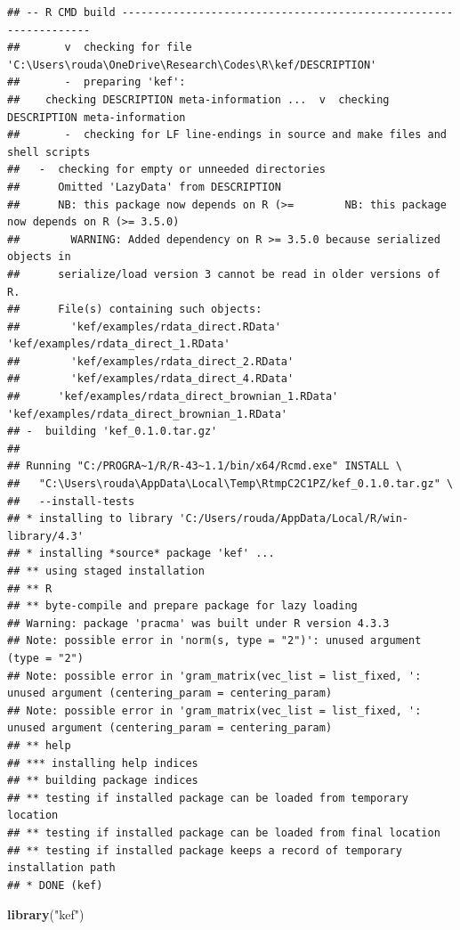 \documentclass[
]{article}
\newenvironment{Shaded}{\begin{snugshade}}{\end{snugshade}}
\newcommand{\FunctionTok}[1]{\textcolor[rgb]{0.13,0.29,0.53}{\textbf{#1}}}
\newcommand{\NormalTok}[1]{#1}
\newcommand{\StringTok}[1]{\textcolor[rgb]{0.31,0.60,0.02}{#1}}
\begin{document}
\begin{verbatim}
## -- R CMD build -----------------------------------------------------------------
##       v  checking for file 'C:\Users\rouda\OneDrive\Research\Codes\R\kef/DESCRIPTION'
##       -  preparing 'kef':
##    checking DESCRIPTION meta-information ...  v  checking DESCRIPTION meta-information
##       -  checking for LF line-endings in source and make files and shell scripts
##   -  checking for empty or unneeded directories
##      Omitted 'LazyData' from DESCRIPTION
##      NB: this package now depends on R (>=        NB: this package now depends on R (>= 3.5.0)
##        WARNING: Added dependency on R >= 3.5.0 because serialized objects in
##      serialize/load version 3 cannot be read in older versions of R.
##      File(s) containing such objects:
##        'kef/examples/rdata_direct.RData' 'kef/examples/rdata_direct_1.RData'
##        'kef/examples/rdata_direct_2.RData'
##        'kef/examples/rdata_direct_4.RData'
##      'kef/examples/rdata_direct_brownian_1.RData'         'kef/examples/rdata_direct_brownian_1.RData'
## -  building 'kef_0.1.0.tar.gz'
##      
## Running "C:/PROGRA~1/R/R-43~1.1/bin/x64/Rcmd.exe" INSTALL \
##   "C:\Users\rouda\AppData\Local\Temp\RtmpC2C1PZ/kef_0.1.0.tar.gz" \
##   --install-tests 
## * installing to library 'C:/Users/rouda/AppData/Local/R/win-library/4.3'
## * installing *source* package 'kef' ...
## ** using staged installation
## ** R
## ** byte-compile and prepare package for lazy loading
## Warning: package 'pracma' was built under R version 4.3.3
## Note: possible error in 'norm(s, type = "2")': unused argument (type = "2") 
## Note: possible error in 'gram_matrix(vec_list = list_fixed, ': unused argument (centering_param = centering_param) 
## Note: possible error in 'gram_matrix(vec_list = list_fixed, ': unused argument (centering_param = centering_param) 
## ** help
## *** installing help indices
## ** building package indices
## ** testing if installed package can be loaded from temporary location
## ** testing if installed package can be loaded from final location
## ** testing if installed package keeps a record of temporary installation path
## * DONE (kef)
\end{verbatim}

\begin{Shaded}
\begin{Highlighting}[]
\FunctionTok{library}\NormalTok{(}\StringTok{"kef"}\NormalTok{)}
\end{Highlighting}
\end{Shaded}
\end{document}
